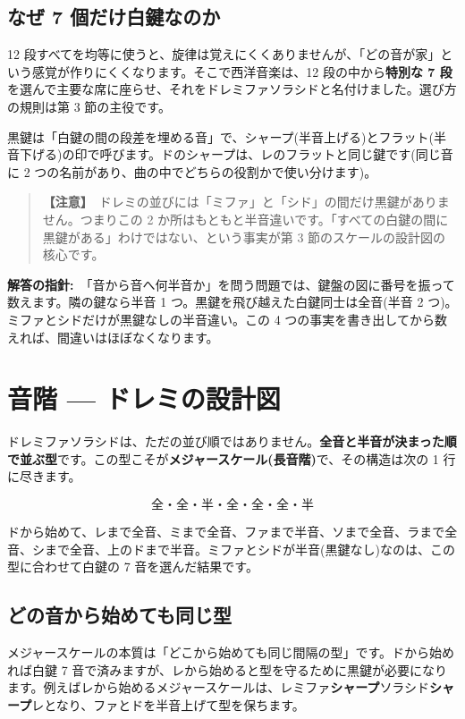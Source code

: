 \documentclass{article}
\begin{document}
\subsection{なぜ 7 個だけ白鍵なのか}

12 段すべてを均等に使うと、旋律は覚えにくくありませんが、「どの音が家」という感覚が作りにくくなります。そこで西洋音楽は、12 段の中から\textbf{特別な 7 段}を選んで主要な席に座らせ、それをドレミファソラシドと名付けました。選び方の規則は第 3 節の主役です。

黒鍵は「白鍵の間の段差を埋める音」で、シャープ(半音上げる)とフラット(半音下げる)の印で呼びます。ドのシャープは、レのフラットと同じ鍵です(同じ音に 2 つの名前があり、曲の中でどちらの役割かで使い分けます)。

\begin{quote}
\textbf{【注意】}\ ドレミの並びには「ミファ」と「シド」の間だけ黒鍵がありません。つまりこの 2 か所はもともと半音違いです。「すべての白鍵の間に黒鍵がある」わけではない、という事実が第 3 節のスケールの設計図の核心です。
\end{quote}

\textbf{解答の指針:}\ 「音から音へ何半音か」を問う問題では、鍵盤の図に番号を振って数えます。隣の鍵なら半音 1 つ。黒鍵を飛び越えた白鍵同士は全音(半音 2 つ)。ミファとシドだけが黒鍵なしの半音違い。この 4 つの事実を書き出してから数えれば、間違いはほぼなくなります。

\section{音階 — ドレミの設計図}

ドレミファソラシドは、ただの並び順ではありません。\textbf{全音と半音が決まった順で並ぶ型}です。この型こそが\textbf{メジャースケール(長音階)}で、その構造は次の 1 行に尽きます。

\[ 全・全・半・全・全・全・半 \]

ドから始めて、レまで全音、ミまで全音、ファまで半音、ソまで全音、ラまで全音、シまで全音、上のドまで半音。ミファとシドが半音(黒鍵なし)なのは、この型に合わせて白鍵の 7 音を選んだ結果です。

\subsection{どの音から始めても同じ型}

メジャースケールの本質は「どこから始めても同じ間隔の型」です。ドから始めれば白鍵 7 音で済みますが、レから始めると型を守るために黒鍵が必要になります。例えばレから始めるメジャースケールは、レミファ\textbf{シャープ}ソラシド\textbf{シャープ}レとなり、ファとドを半音上げて型を保ちます。
\end{document}
